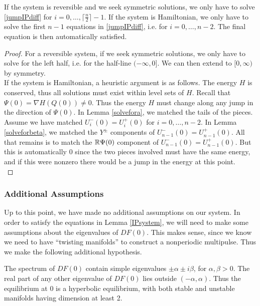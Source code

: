 \documentclass[thesis.tex]{subfiles}
\begin{document}
\begin{lemma}\label{IPsystemreduced}
If the system is reversible and we seek symmetric solutions, we only have to solve \eqref{jumpIPdiff} for $i = 0, \dots, \lceil \frac{n}{2} \rceil - 1$. If the system is Hamiltonian, we only have to solve the first $n-1$ equations in \eqref{jumpIPdiff}, i.e. for $i = 0, \dots, n-2$. The final equation is then automatically satisfied.

\begin{proof}
For a reversible system, if we seek symmetric solutions, we only have to solve for the left half, i.e. for the half-line $(-\infty, 0]$. We can then extend to $[0, \infty)$ by symmetry.\\

If the system is Hamiltonian, a heuristic argument is as follows. The energy $H$ is conserved, thus all solutions must exist within level sets of $H$. Recall that $\Psi(0) = \nabla H(Q(0)) \neq 0$. Thus the energy $H$ must change along any jump in the direction of $\Psi(0)$. In Lemma \ref{solvefora}, we matched the tails of the pieces. Assume we have matched $U_i^-(0) = U_i^+(0)$ for $i = 0, \dots, n-2$. In Lemma \ref{solveforbeta}, we matched the $Y^\pm$ components of $U_{n-1}^-(0) = U_{n-1}^+(0)$. All that remains is to match the ${\mathbb R} \Psi(0)$ component of $U_{n-1}^-(0) = U_{n-1}^+(0)$. But this is automatically 0 since the two pieces involved must have the same energy, and if this were nonzero there would be a jump in the energy at this point.\\
\end{proof}
\end{lemma}

\subsubsection{Additional Assumptions}

Up to this point, we have made no additional assumptions on our system. In order to satisfy the equations in Lemma \ref{IPsystem}, we will need to make some assumptions about the eigenvalues of $DF(0)$. This makes sense, since we know we need to have ``twisting manifolds'' to construct a nonperiodic multipulse. Thus we make the following additional hypothesis.

\begin{hypothesis}\label{spechyp}
The spectrum of $DF(0)$ contain simple eigenvalues $\pm \alpha \pm i \beta$, for $\alpha, \beta > 0$. The real part of any other eigenvalue of $DF(0)$ lies outside $(-\alpha, \alpha)$. Thus the equilibrium at 0 is a hyperbolic equilibrium, with both stable and unstable manifolds having dimension at least 2.
\end{hypothesis}
\end{document}
